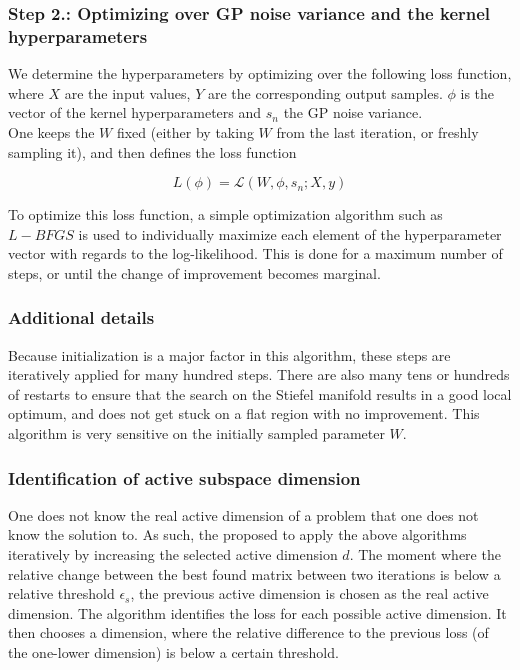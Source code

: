 \subsubsection{Step 2.: Optimizing over GP noise variance and the kernel hyperparameters}

We determine the hyperparameters by optimizing over the following loss function, where $X$ are the input values, $Y$ are the corresponding output samples. $\phi$ is the vector of the kernel hyperparameters and $s_n$ the GP noise variance. \\

One keeps the $W$ fixed (either by taking $W$ from the last iteration, or freshly sampling it), and then defines the loss function

\begin{equation}
	L(\phi) = \mathcal{L}(W, \phi, s_n; X, y) 
\end{equation}

To optimize this loss function, a simple optimization algorithm such as $L-BFGS$ is used to individually maximize each element of the hyperparameter vector with regards to the log-likelihood.
This is done for a maximum number of steps, or until the change of improvement becomes marginal. \\

\subsubsection{Additional details}
Because initialization is a major factor in this algorithm, these steps are iteratively applied for many hundred steps.
There are also many tens or hundreds of restarts to ensure that the search on the Stiefel manifold results in a good local optimum, and does not get stuck on a flat region with no improvement.
This algorithm is very sensitive on the initially sampled parameter $W$.

\subsubsection{Identification of active subspace dimension }
One does not know the real active dimension of a problem that one does not know the solution to.
As such, the proposed to apply the above algorithms iteratively by increasing the selected active dimension $d$.
The moment where the relative change between the best found matrix between two iterations is below a relative threshold $\epsilon_s$, the previous active dimension is chosen as the real active dimension. 
The algorithm identifies the loss for each possible active dimension.
It then chooses a dimension, where the relative difference to the previous loss (of the one-lower dimension) is below a certain threshold.


